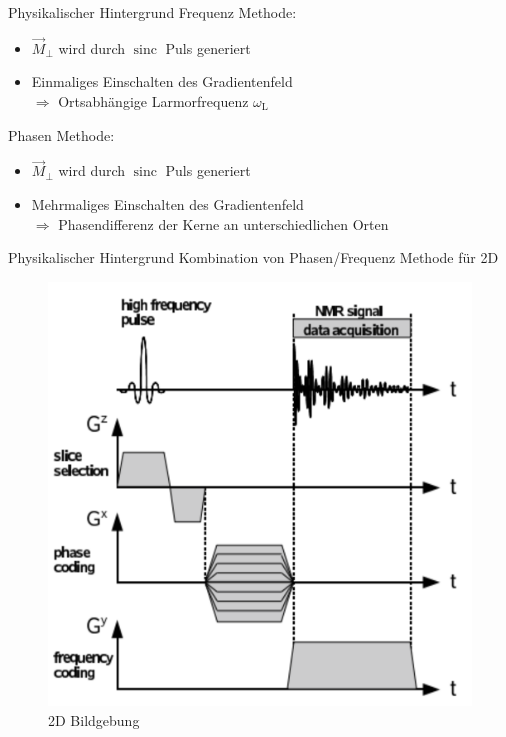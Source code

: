 \begin{frame}{Physikalischer Hintergrund}
Frequenz Methode:
	\begin{itemize}
	\item $\vec{M}_\bot$ wird durch $\operatorname{sinc}$ Puls generiert
	\item Einmaliges Einschalten des Gradientenfeld\\
	$\Rightarrow$ Ortsabhängige Larmorfrequenz $\omega_\text{L}$
	\end{itemize}
\vspace{.5cm}
Phasen Methode:
	\begin{itemize}
	\item $\vec{M}_\bot$ wird durch $\operatorname{sinc}$ Puls generiert
	\item Mehrmaliges Einschalten des Gradientenfeld\\
	$\Rightarrow$ Phasendifferenz der Kerne an unterschiedlichen Orten
	\end{itemize}
\end{frame}

\begin{frame}{Physikalischer Hintergrund}
Kombination von Phasen/Frequenz Methode für 2D %
	\begin{figure}
	\centering
	\includegraphics[scale=.15]{images//signal.png}
	\caption{2D Bildgebung \cite{script_nmr}}
	\end{figure}
\end{frame}

